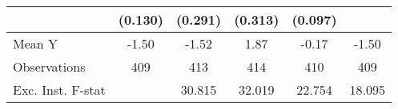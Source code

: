 {\begin{tabular}{l*{5}{c}}
            &     (0.130)         &     (0.291)         &     (0.313)         &     (0.097)         &                     \\
\midrule
Mean Y      &       -1.50         &       -1.52         &        1.87         &       -0.17         &       -1.50         \\
Observations&         409         &         413         &         414         &         410         &         409         \\
Exc. Inst. F-stat&                     &      30.815         &      32.019         &      22.754         &      18.095         \\
\bottomrule
\end{tabular}
}
